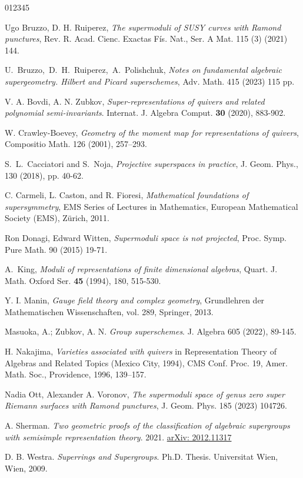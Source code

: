 \documentclass[12pt, reqno]{amsart}
\theoremstyle{plain}
\numberwithin{equation}{section}
\begin{document}
\begin{thebibliography}{012345}

 Ugo Bruzzo, D. H. Ruiperez, \emph{The supermoduli of SUSY curves with Ramond punctures}, Rev. R. Acad. Cienc. Exactas Fís. Nat., Ser. A Mat. 115 (3) (2021) 144.

 U.~Bruzzo,~D.~H.~Ruiperez,~A.~Polishchuk, \emph{Notes on fundamental algebraic supergeometry. Hilbert and Picard superschemes}, Adv. Math. 415 (2023) 115 pp.
   
  V. A. Bovdi, A. N. Zubkov, \emph{Super-representations of quivers and related polynomial semi-invariants}. Internat. J. Algebra Comput. \textbf{30} (2020), 883-902.   

 W. Crawley-Boevey, \emph{Geometry of the moment map for representations of quivers}, Compositio Math. 126 (2001), 257--293.

 S.~L.~Cacciatori and S.~Noja, \emph{Projective superspaces in practice}, J. Geom. Phys., 130 (2018), pp. 40-62.

 C. Carmeli, L. Caston, and R. Fioresi, \emph{Mathematical foundations of supersymmetry}, EMS Series of
Lectures in Mathematics, European Mathematical Society (EMS), Z\"urich, 2011.
        
 Ron Donagi, Edward Witten, \emph{Supermoduli space is not projected}, Proc. Symp. Pure Math. 90 (2015) 19-71.

 A.~King, \emph{Moduli of representations of finite dimensional algebras}, Quart. J. Math. Oxford Ser. \textbf{45} (1994), 180, 515-530.
         
 Y. I. Manin, \emph{Gauge field theory and complex geometry}, Grundlehren der Mathematischen Wissenschaften, vol. 289, Springer, 2013. 

 Masuoka, A.; Zubkov, A. N. \emph{Group superschemes}. J. Algebra 605 (2022), 89-145.

 H. Nakajima, \emph{Varieties associated with quivers} in Representation Theory of Algebras and Related Topics (Mexico City, 1994), CMS Conf. Proc. 19, Amer. Math. Soc., Providence, 1996, 139--157.

 Nadia Ott, Alexander A. Voronov, \emph{The supermoduli space of genus zero super Riemann surfaces with Ramond punctures}, J. Geom. Phys. 185 (2023) 104726.

 A. Sherman. \emph{Two geometric proofs of the classification of algebraic supergroups with semisimple representation theory}. 2021. \url{arXiv: 2012.11317}

 D. B. Westra. \emph{Superrings and Supergroups}. Ph.D. Thesis. Universitat Wien, Wien, 2009.
 		
\end{thebibliography}
\end{document}

